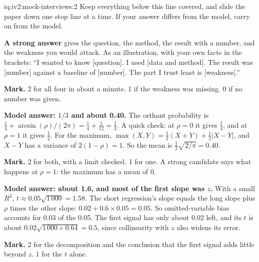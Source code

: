 \begin{solution}{iq:iv2:mock-interviews:2}
Keep everything below this line covered, and slide the paper down one stop line at a time. If your answer differs from the model, carry on from the model.

\ivstop
\textbf{A strong answer} gives the question, the method, the result with a number, and the weakness you would attack. As an illustration, with your own facts in the brackets: ``I wanted to know [question]. I used [data and method]. The result was [number] against a baseline of [number]. The part I trust least is [weakness].''

\textbf{Mark.} 2 for all four in about a minute. 1 if the weakness was missing. 0 if no number was given.

\ivstop
\textbf{Model answer: $1/3$ and about 0.40.} The orthant probability is $\tfrac14 + \arcsin(\rho)/(2\pi) = \tfrac14 + \tfrac{1}{12} = \tfrac13$. A quick check: at $\rho = 0$ it gives $\tfrac14$, and at $\rho = 1$ it gives $\tfrac12$. For the maximum, $\max(X, Y) = \tfrac12(X + Y) + \tfrac12|X - Y|$, and $X - Y$ has a variance of $2(1 - \rho) = 1$. So the mean is $\tfrac12\sqrt{2/\pi} = 0.40$.

\textbf{Mark.} 2 for both, with a limit checked. 1 for one. A strong candidate says what happens at $\rho = 1$: the maximum has a mean of 0.

\ivstop
\textbf{Model answer: about 1.6, and most of the first slope was $z$.} With a small $R^2$, $t \approx 0.05\sqrt{1\,000} = 1.58$. The short regression's slope equals the long slope plus $\rho$ times the other slope: $0.02 + 0.6 \times 0.05 = 0.05$. So omitted-variable bias accounts for 0.03 of the 0.05. The first signal has only about $0.02$ left, and its $t$ is about $0.02\sqrt{1\,000 \times 0.64} = 0.5$, since collinearity with $z$ also widens its error.

\textbf{Mark.} 2 for the decomposition and the conclusion that the first signal adds little beyond $z$. 1 for the $t$ alone.


\end{solution}
